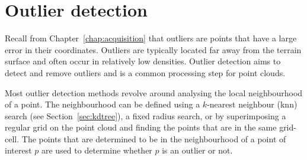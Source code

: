 %
\section{Outlier detection}%
\label{sec:outlier_detection}

Recall from Chapter~\ref{chap:acquisition} that outliers are points that have a large error in their coordinates.
Outliers are typically located far away from the terrain surface and often occur in relatively low densities.
Outlier detection aims to detect and remove outliers and is a common processing step for point clouds.

Most outlier detection methods revolve around analysing the local neighbourhood of a point.
The neighbourhood can be defined using a $k$-nearest neighbour (knn) search (see Section~\ref{sec:kdtree}), a fixed radius search, or by superimposing a regular grid on the point cloud and finding the points that are in the same grid-cell.
The points that are determined to be in the neighbourhood of a point of interest $p$ are used to determine whether $p$ is an outlier or not.

